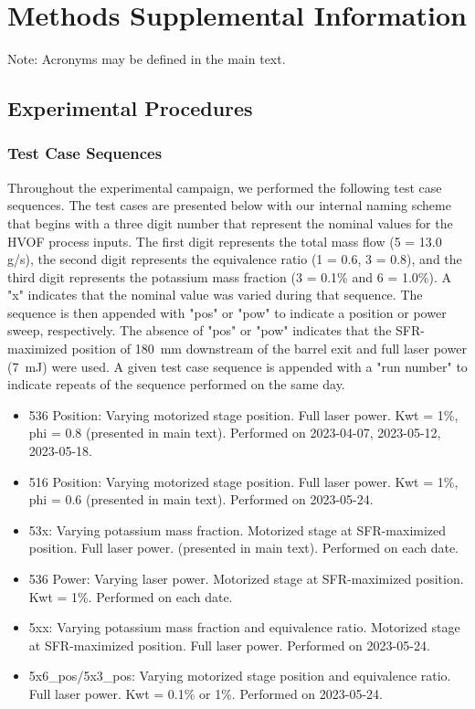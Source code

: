\section{Methods Supplemental Information}

Note: Acronyms may be defined in the main text. 

\subsection{Experimental Procedures}

\subsubsection{Test Case Sequences}


Throughout the experimental campaign, we performed the following test case sequences. The test cases are presented below with our internal naming scheme that begins with a three digit number that represent the nominal values for the HVOF process inputs. The first digit represents the total mass flow (5 = 13.0 g/s), the second digit represents the equivalence ratio (1 = 0.6, 3 = 0.8), and the third digit represents the potassium mass fraction (3 = 0.1\% and 6 = 1.0\%). A "x" indicates that the nominal value was varied during that sequence. The sequence is then appended with "pos" or "pow" to indicate a position or power sweep, respectively. The absence of "pos" or "pow" indicates that the SFR-maximized position of \SI{180} {mm} downstream of the barrel exit and full laser power (\SI{7} {mJ}) were used. A given test case sequence is appended with a "run number" to indicate repeats of the sequence performed on the same day. 

\begin{itemize}
    \item 536 Position: Varying motorized stage position. Full laser power. Kwt = 1\%, phi = 0.8 (presented in main text). Performed on 2023-04-07, 2023-05-12, 2023-05-18.
    \item 516 Position: Varying motorized stage position. Full laser power. Kwt = 1\%, phi = 0.6 (presented in main text). Performed on 2023-05-24.
    \item 53x: Varying potassium mass fraction. Motorized stage at SFR-maximized position. Full laser power. (presented in main text). Performed on each date. 
    \item 536 Power: Varying laser power. Motorized stage at SFR-maximized position. Kwt = 1\%. Performed on each date. 
    \item 5xx: Varying potassium mass fraction and equivalence ratio. Motorized stage at SFR-maximized position. Full laser power. Performed on 2023-05-24.
    \item 5x6\_pos/5x3\_pos: Varying motorized stage position and equivalence ratio. Full laser power. Kwt = 0.1\% or 1\%. Performed on 2023-05-24.
\end{itemize}

